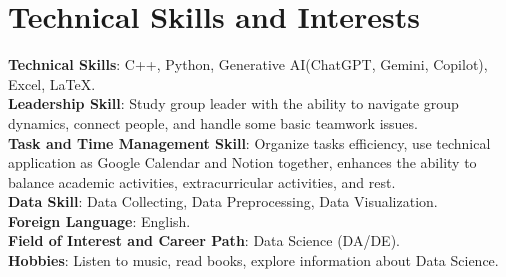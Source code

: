 \documentclass[a4paper,11pt]{article}
\begin{document}
\section{\textbf{Technical Skills and Interests}}
 \begin{itemize}[leftmargin=0.1in, label={}]
    \small{\item{
     \textbf{Technical Skills}{: C++, Python, Generative AI(ChatGPT, Gemini, Copilot), Excel, LaTeX.} \\
     \textbf{Leadership Skill}{: Study group leader with the ability to navigate group dynamics, connect people, and handle some basic teamwork issues.} \\
     \textbf{Task and Time Management Skill}{: Organize tasks efficiency, use technical application as Google Calendar and Notion together, enhances the ability to balance academic activities, extracurricular activities, and rest.} \\
     \textbf{Data Skill}{: Data Collecting, Data Preprocessing, Data Visualization.} \\
     \textbf{Foreign Language}{: English.} \\
     \textbf{Field of Interest and Career Path}{: Data Science (DA/DE).} \\
     \textbf{Hobbies}{: Listen to music, read books, explore information about Data Science.} \\
     
    }}
 \end{itemize}
 \vspace{-16pt}
\end{document}
